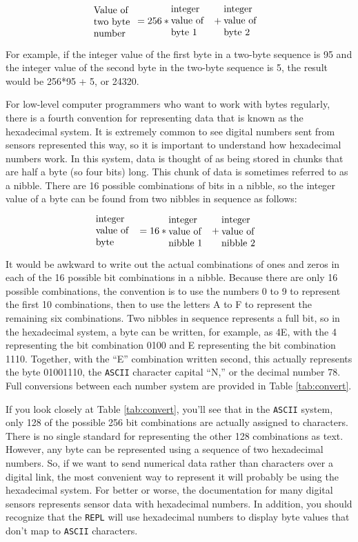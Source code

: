 \begin{equation}
\label{eq:base256}
\text{\parbox[c]{1.5cm}{\raggedright Value of two byte number}} = 256 *\text{\parbox[c]{1.5cm}{\raggedright integer value of byte 1}} + \text{\parbox[c]{1.5cm}{\raggedright integer value of byte 2}} 
\end{equation}

For example, if the integer value of the first byte in a two-byte sequence is 95 and the integer value of the second byte in the two-byte sequence is 5, the result would be 256*95 + 5, or 24320.

For low-level computer programmers who want to work with bytes regularly, there is a fourth convention for representing data that is known as the hexadecimal system.
It is extremely common to see digital numbers sent from sensors represented this way, so it is important to understand how hexadecimal numbers work.
In this system, data is thought of as being stored in chunks that are half a byte (so four bits) long.
This chunk of data is sometimes referred to as a nibble.
There are 16 possible combinations of bits in a nibble, so the integer value of a byte can be found from two nibbles in sequence as follows:

\begin{equation}
\label{eq:base16}
\text{\parbox[c]{1.5cm}{\raggedright integer value of byte}} = 16 *\text{\parbox[c]{1.5cm}{\raggedright integer value of nibble 1}} + \text{\parbox[c]{1.5cm}{\raggedright integer value of nibble 2}} 
\end{equation}

It would be awkward to write out the actual combinations of ones and zeros in each of the 16 possible bit combinations in a nibble.
Because there are only 16 possible combinations, the convention is to use the numbers 0 to 9 to represent the first 10 combinations, then to use the letters A to F to represent the remaining six combinations.
Two nibbles in sequence represents a full bit, so in the hexadecimal system, a byte can be written, for example, as 4E, with the 4 representing the bit combination 0100 and E representing the bit combination 1110.
Together, with the “E” combination written second, this actually represents the byte 01001110, the \texttt{ASCII} character capital “N,” or the decimal number 78.
Full conversions between each number system are provided in Table \ref{tab:convert}.  

If you look closely at Table \ref{tab:convert}, you’ll see that in the \texttt{ASCII} system, only 128 of the possible 256 bit combinations are actually assigned to characters.
There is no single standard for representing the other 128 combinations as text.  
However, any byte can be represented using a sequence of two hexadecimal numbers.
So, if we want to send numerical data rather than characters over a digital link, the most convenient way to represent it will probably be using the hexadecimal system.
For better or worse, the documentation for many digital sensors represents sensor data with hexadecimal numbers.
In addition, you should recognize that the \Micropython \texttt{REPL} will use hexadecimal numbers to display byte values that don’t map to \texttt{ASCII} characters.

